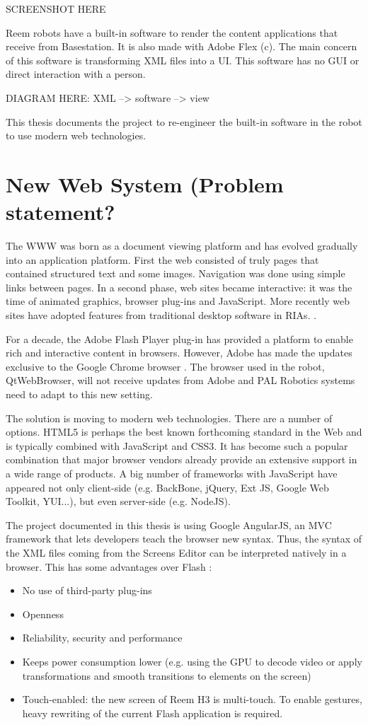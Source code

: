 SCREENSHOT HERE

Reem robots have a built-in software to render the content applications that receive from Basestation. 
It is also made with Adobe Flex (c).
The main concern of this software is transforming \ac{XML} files into a \ac{UI}. 
This software has no \ac{GUI} or direct interaction with a person.

DIAGRAM HERE: XML --> software --> view

This thesis documents the project to re-engineer the built-in software in the robot to use modern web technologies.

\section{New Web System (Problem statement?}
The \ac{WWW} was born as a document viewing platform and has evolved gradually into an application platform. 
First the web consisted of truly pages that contained structured text and some images. 
Navigation was done using simple links between pages. 
In a second phase, web sites became interactive: 
it was the time of animated graphics, browser plug-ins and JavaScript. 
More recently web sites have adopted features from traditional desktop software in \acp{RIA}. \cite{Anttonen:2011}.

For a decade, the Adobe Flash Player plug-in has provided a platform to enable rich and interactive content in browsers.
However, Adobe has made the updates exclusive to the Google Chrome browser \cite{FlashRoadmap}. 
The browser used in the robot, QtWebBrowser, will not receive updates from Adobe and PAL Robotics systems need to adapt to this new setting. 

The solution is moving to modern web technologies.
There are a number of options. \ac{HTML5} is perhaps the best known forthcoming standard in the Web and is typically combined with JavaScript and \ac{CSS3}. 
It has become such a popular combination that major browser vendors already provide an extensive support in a wide range of products.
A big number of frameworks with JavaScript have appeared not only client-side (e.g. BackBone, jQuery, Ext JS, Google Web Toolkit, YUI...), but even server-side (e.g. NodeJS).

The project documented in this thesis is using Google AngularJS, an \ac{MVC} framework that lets developers teach the browser new syntax. 
Thus, the syntax of the \ac{XML} files coming from the Screens Editor can be interpreted natively in a browser. 
This has some advantages over Flash \cite{Jobs:ThoughtsOnFlash}:
\begin{itemize}
    \item No use of third-party plug-ins
    \item Openness
    \item Reliability, security and performance
    \item Keeps power consumption lower (e.g. using the GPU to decode video or apply transformations and smooth transitions to elements on the screen)
    \item Touch-enabled: the new screen of Reem H3 is multi-touch. To enable gestures, heavy rewriting of the current Flash application is required.
\end{itemize}


